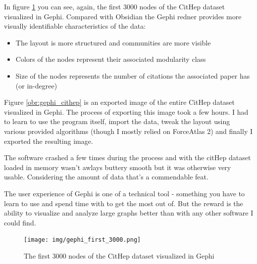 In figure \ref{obr:gephi_cithep_3k} you can see, again, the first 3000 nodes of the CitHep dataset visualized in Gephi.
Compared with Obsidian the Gephi redner provides more visually identifiable characteristics of the data:

\begin{itemize}
  \item The layout is more structured and communities are more visible
  \item Colors of the nodes represent their associated modularity class
  \item Size of the nodes represents the number of citations the associated paper has (or in-degree)
\end{itemize}

Figure \ref{obr:gephi_cithep} is an exported image of the entire CitHep dataset visualized in Gephi.
The process of exporting this image took a few hours.
I had to learn to use the program itself, import the data,
tweak the layout using various provided algorithms (though I mostly relied on ForceAtlas 2) and finally I exported the resulting image.

The software crashed a few times during the process and with the citHep dataset loaded in memory wasn't awlays buttery smooth but it was otherwise very usable.
Considering the amount of data that's a commendable feat.


The user experience of Gephi is one of a technical tool - something you have to learn to use and spend time with to get the most out of.
But the reward is the ability to visualize and analyze large graphs better than with any other software I could find.

\begin{figure}[p]\centering
  \texttt{[image: img/gephi\_first\_3000.png]}
  \caption{The first 3000 nodes of the CitHep dataset visualized in Gephi}
  \label{obr:gephi_cithep_3k}
\end{figure}


